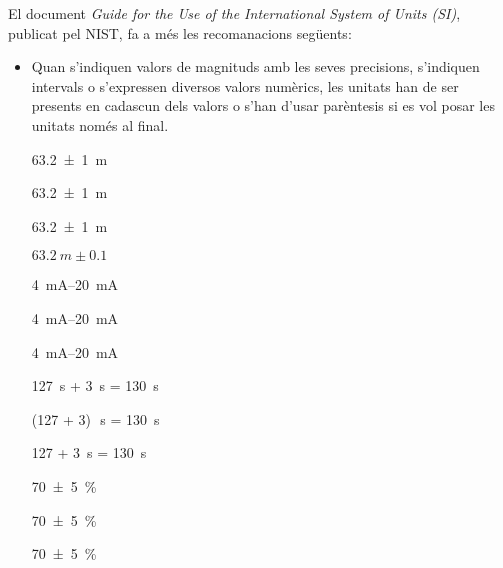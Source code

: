 El document  \textit{Guide for the Use of the International System of Units (SI)}, publicat pel NIST,  fa a més les recomanacions següents:

\begin{itemize}

\item Quan s'indiquen valors de magnituds amb les seves precisions,
s'indiquen intervals o s'expressen diversos valors numèrics, les
unitats han de ser presents en cadascun dels valors o s'han d'usar
parèntesis si es vol posar les unitats només al final.

\textcolor{Green}\faCheckSquare{} \qty[separate-uncertainty, separate-uncertainty-units = repeat]{63,2(1)}{m}

\textcolor{Green}\faCheckSquare{} \qty[separate-uncertainty]{63,2(1)}{m}

\textcolor{Blue}\faExclamationTriangle{} \qty[separate-uncertainty, separate-uncertainty-units = single]{63,2(1)}{m}

\textcolor{Blue}\faExclamationTriangle{}  $\qty{63,2}{m} \pm \num{0,1}$


\textcolor{Green}\faCheckSquare{} \qtyrange{4}{20}{mA}

\textcolor{Green}\faCheckSquare{} \qtyrange[range-units = bracket]{4}{20}{mA}

\textcolor{Blue}\faExclamationTriangle{} \qtyrange[range-units = single]{4}{20}{mA}


\textcolor{Green}\faCheckSquare{} 

\textcolor{Green}\faCheckSquare{} 

\textcolor{Blue}\faExclamationTriangle{} 


\textcolor{Green}\faCheckSquare{} \qty{127}{s} + \qty{3}{s} = \qty{130}{s}

\textcolor{Green}\faCheckSquare{}  (127 + 3)\unit{\,s} = \qty{130}{s}

\textcolor{Blue}\faExclamationTriangle{}  127 + \qty{3}{s} = \qty{130}{s}


\textcolor{Green}\faCheckSquare{} \qty[separate-uncertainty, separate-uncertainty-units = repeat]{70(5)}{\percent}

\textcolor{Green}\faCheckSquare{} \qty[separate-uncertainty]{70(5)}{\percent}

\textcolor{Blue}\faExclamationTriangle{} \qty[separate-uncertainty, separate-uncertainty-units = single]{70(5)}{\percent}



\end{itemize}
